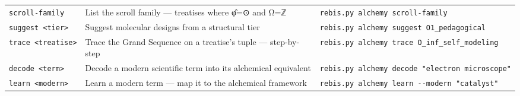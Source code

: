 \documentclass[12pt,a4paper]{article}
\begin{document}
\begin{longtable}[]{@{}lll@{}}
\begin{minipage}[t]{0.32\columnwidth}
\texttt{scroll-family}\strut
\end{minipage} & \begin{minipage}[t]{0.35\columnwidth}\raggedright
List the scroll family --- treatises where φ̂=⊙ and Ω=ℤ\strut
\end{minipage} & \begin{minipage}[t]{0.24\columnwidth}\raggedright
\texttt{rebis.py\ alchemy\ scroll-family}\strut
\end{minipage}\tabularnewline
\begin{minipage}[t]{0.32\columnwidth}\raggedright
\texttt{suggest\ \textless{}tier\textgreater{}}\strut
\end{minipage} & \begin{minipage}[t]{0.35\columnwidth}\raggedright
Suggest molecular designs from a structural tier\strut
\end{minipage} & \begin{minipage}[t]{0.24\columnwidth}\raggedright
\texttt{rebis.py\ alchemy\ suggest\ O1\_pedagogical}\strut
\end{minipage}\tabularnewline
\begin{minipage}[t]{0.32\columnwidth}\raggedright
\texttt{trace\ \textless{}treatise\textgreater{}}\strut
\end{minipage} & \begin{minipage}[t]{0.35\columnwidth}\raggedright
Trace the Grand Sequence on a treatise's tuple --- step-by-step\strut
\end{minipage} & \begin{minipage}[t]{0.24\columnwidth}\raggedright
\texttt{rebis.py\ alchemy\ trace\ O\_inf\_self\_modeling}\strut
\end{minipage}\tabularnewline
\begin{minipage}[t]{0.32\columnwidth}\raggedright
\texttt{decode\ \textless{}term\textgreater{}}\strut
\end{minipage} & \begin{minipage}[t]{0.35\columnwidth}\raggedright
Decode a modern scientific term into its alchemical equivalent\strut
\end{minipage} & \begin{minipage}[t]{0.24\columnwidth}\raggedright
\texttt{rebis.py\ alchemy\ decode\ "electron\ microscope"}\strut
\end{minipage}\tabularnewline
\begin{minipage}[t]{0.32\columnwidth}\raggedright
\texttt{learn\ \textless{}modern\textgreater{}}\strut
\end{minipage} & \begin{minipage}[t]{0.35\columnwidth}\raggedright
Learn a modern term --- map it to the alchemical framework\strut
\end{minipage} & \begin{minipage}[t]{0.24\columnwidth}\raggedright
\texttt{rebis.py\ alchemy\ learn\ -\/-modern\ "catalyst"}\strut
\end{minipage}\tabularnewline
\bottomrule
\end{longtable}
\end{document}

